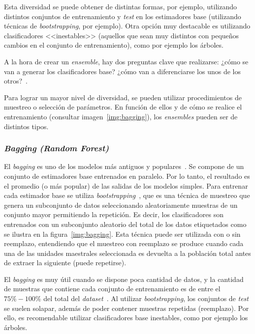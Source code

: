 Esta diversidad se puede obtener de distintas formas, por ejemplo, utilizando distintos conjuntos de entrenamiento y \textit{test} en los estimadores base (utilizando técnicas de \textit{bootstrapping}, por ejemplo). Otra opción muy destacable es utilizando clasificadores <<inestables>> (aquellos que sean muy distintos con pequeños cambios en el conjunto de entrenamiento), como por ejemplo los árboles.

A la hora de crear un \textit{ensemble}, hay dos preguntas clave que realizarse: ¿cómo se van a generar los clasificadores base? ¿cómo van a diferenciarse los unos de los otros?~\cite{ensembles2006robi}.

Para lograr un mayor nivel de diversidad, se pueden utilizar procedimientos de muestreo o selección de parámetros. En función de ellos y de cómo se realice el entrenamiento (consultar imagen~\ref{img:bagging}), los \textit{ensembles} pueden ser de distintos tipos.
	
\subsubsection{\textit{Bagging (Random Forest)}}

El \textit{bagging} es uno de los modelos más antiguos y populares~\cite{ensembles2006robi}. Se compone de un conjunto de estimadores base entrenados en paralelo. Por lo tanto, el resultado es el promedio (o más popular) de las salidas de los modelos simples. Para entrenar cada estimador base se utiliza \textit{bootstrapping}~\cite{engelen2018thesis}, que es una técnica de muestreo que genera un subconjunto de datos seleccionando aleatoriamente muestras de un conjunto mayor permitiendo la repetición. Es decir, los clasificadores son entrenados con un subconjunto aleatorio del total de los datos etiquetados como se ilustra en la figura~\ref{img:bagging}. Esta técnica puede ser utilizada con o sin reemplazo, entendiendo que el muestreo con reemplazo se produce cuando cada una de las unidades maestrales seleccionada es devuelta a la población total antes de extraer la siguiente (puede repetirse).

El \textit{bagging} es muy útil cuando se dispone poca cantidad de datos, y la cantidad de muestras que contiene cada conjunto de entrenamiento es de entre el $75\% - 100\%$ del total del \textit{dataset}~\cite{ensembles2006robi}. Al utilizar \textit{bootstrapping}, los conjuntos de \textit{test} se suelen solapar, además de poder contener muestras repetidas (reemplazo). Por ello, es recomendable utilizar clasificadores base inestables, como por ejemplo los árboles.

